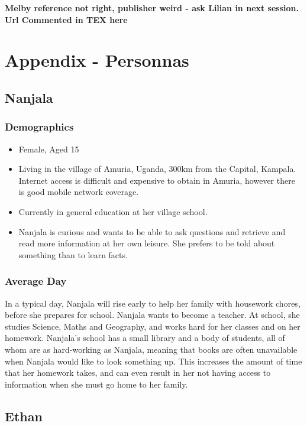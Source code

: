 \documentclass{article}
\begin{document}
\newpage

{\bf Melby reference not right, publisher weird - ask Lilian in next session.  Url Commented in TEX here} 



\section{Appendix - Personnas}
\label{sec:appendixPersonnas}
\subsection{Nanjala}
\subsubsection{Demographics}
\begin{itemize}
  \item Female, Aged 15
  \item Living in the village of Amuria, Uganda, 300km from the Capital, Kampala.  Internet access is difficult and expensive to obtain in Amuria, however there is good mobile network coverage.
  \item Currently in general education at her village school.
  \item Nanjala is curious and wants to be able to ask questions and retrieve and read more information at her own leisure.  She prefers to be told about something than to learn facts.
\end{itemize}
\subsubsection{Average Day}
In a typical day, Nanjala will rise early to help her family with housework chores, before she prepares for school.  Nanjala wants to become a teacher.  At school, she studies Science, Maths and Geography, and works hard for her classes and on her homework.  Nanjala's school has a small library and a body of students, all of whom are as hard-working as Nanjala, meaning that books are often unavailable when Nanjala would like to look something up.  This increases the amount of time that her homework takes, and can even result in her not having access to information when she must go home to her family.

\subsection{Ethan}
\end{document}
